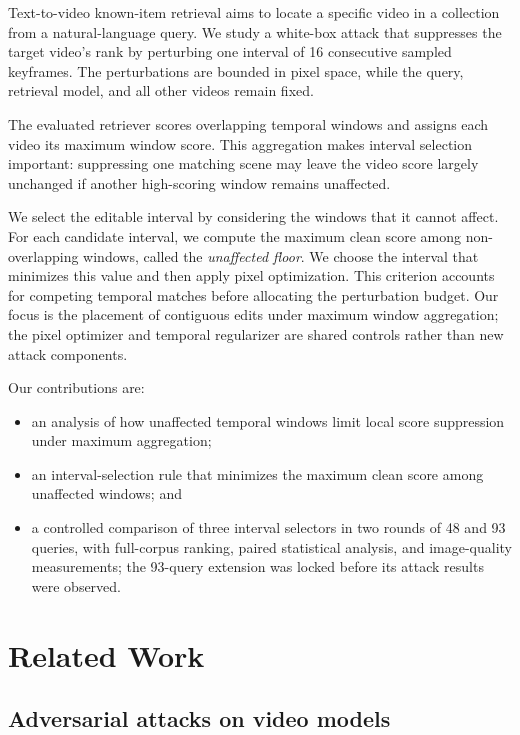 \documentclass[runningheads]{llncs}
\begin{document}
Text-to-video known-item retrieval aims to locate a specific video in a collection from a natural-language query. We study a white-box attack that suppresses the target video's rank by perturbing one interval of 16 consecutive sampled keyframes. The perturbations are bounded in pixel space, while the query, retrieval model, and all other videos remain fixed.

The evaluated retriever scores overlapping temporal windows and assigns each video its maximum window score. This aggregation makes interval selection important: suppressing one matching scene may leave the video score largely unchanged if another high-scoring window remains unaffected.

We select the editable interval by considering the windows that it cannot affect. For each candidate interval, we compute the maximum clean score among non-overlapping windows, called the \emph{unaffected floor}. We choose the interval that minimizes this value and then apply pixel optimization. This criterion accounts for competing temporal matches before allocating the perturbation budget. Our focus is the placement of contiguous edits under maximum window aggregation; the pixel optimizer and temporal regularizer are shared controls rather than new attack components.

\noindent Our contributions are:\nopagebreak
\begin{itemize}
\item an analysis of how unaffected temporal windows limit local score suppression under maximum aggregation;
\item an interval-selection rule that minimizes the maximum clean score among unaffected windows; and
\item a controlled comparison of three interval selectors in two rounds of 48 and 93 queries, with full-corpus ranking, paired statistical analysis, and image-quality measurements; the 93-query extension was locked before its attack results were observed.
\end{itemize}


\section{Related Work}

\subsection{Adversarial attacks on video models}
\end{document}
